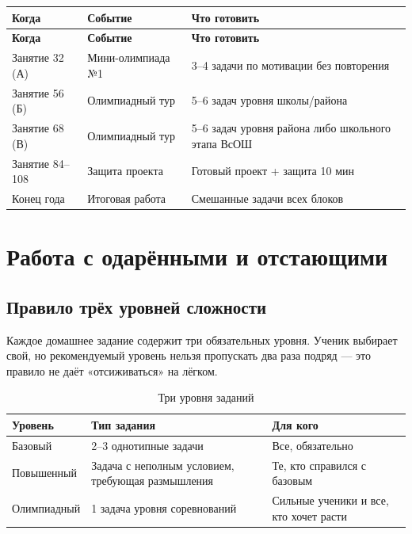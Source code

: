 \documentclass[12pt,a4paper]{article}
\begin{document}
\begin{longtable}{L{2.4cm}L{4.4cm}L{7.2cm}}
\toprule
\textbf{Когда} & \textbf{Событие} & \textbf{Что готовить}\\
\midrule
\endfirsthead

\toprule
\textbf{Когда} & \textbf{Событие} & \textbf{Что готовить}\\
\midrule
\endhead

Занятие 32 (А) & Мини-олимпиада №1 & 3--4 задачи по мотивации
без повторения\\
Занятие 56 (Б) & Олимпиадный тур & 5--6 задач уровня школы/района\\
Занятие 68 (В) & Олимпиадный тур & 5--6 задач уровня района
либо школьного этапа ВсОШ\\
Занятие 84--108 & Защита проекта & Готовый проект + защита 10 мин\\
Конец года & Итоговая работа & Смешанные задачи всех блоков\\
\end{longtable}

\section{Работа с одарёнными и отстающими}

\subsection{Правило трёх уровней сложности}

Каждое домашнее задание содержит три обязательных уровня.
Ученик выбирает свой, но рекомендуемый уровень нельзя пропускать
два раза подряд --- это правило не даёт «отсиживаться» на лёгком.

\begin{table}[H]
\centering
\caption{Три уровня заданий}
\label{tab:levels}
\begin{tabular}{L{2.6cm}L{4.2cm}L{7.4cm}}
\toprule
\textbf{Уровень} & \textbf{Тип задания} & \textbf{Для кого}\\
\midrule
Базовый & 2--3 однотипные задачи & Все, обязательно\\
Повышенный & Задача с неполным условием, требующая
размышления & Те, кто справился с базовым\\
Олимпиадный & 1 задача уровня соревнований & Сильные ученики
и все, кто хочет расти\\
\bottomrule
\end{tabular}
\end{table}
\end{document}

